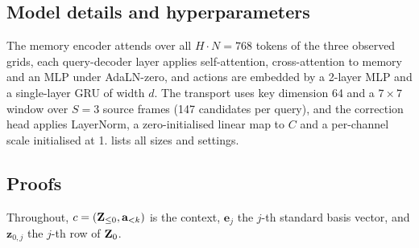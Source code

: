\subsection{Model details and hyperparameters}\label{app:impl}
The memory encoder attends over all $H\cdot N{=}768$ tokens of the three observed grids, each query-decoder layer
applies self-attention, cross-attention to memory and an MLP under AdaLN-zero, and actions are embedded by a 2-layer MLP
and a single-layer GRU of width $d$.
%
The transport uses key dimension 64 and a $7{\times}7$ window over $S{=}3$ source frames (147 candidates per query), and
the correction head applies LayerNorm, a zero-initialised linear map to $C$ and a per-channel scale initialised at 1.
%
 lists all sizes and settings.


\subsection{Proofs}\label{app:proofs}
Throughout, $c=(\mathbf{Z}_{\le 0},\mathbf{a}_{<k})$ is the context, $\mathbf{e}_j$ the $j$-th standard basis vector, and
$\mathbf{z}_{0,j}$ the $j$-th row of $\mathbf{Z}_0$.

